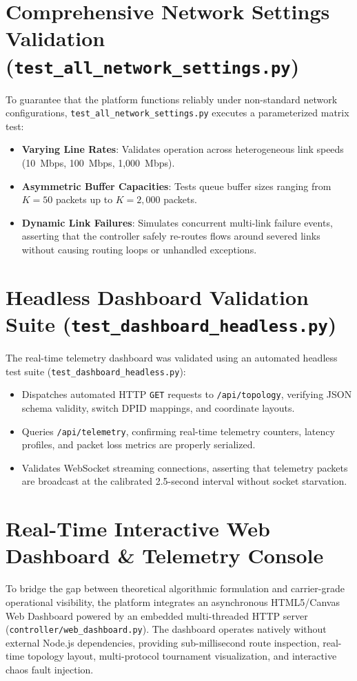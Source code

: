 \section{Comprehensive Network Settings Validation (\texttt{test\_all\_network\_settings.py})}
To guarantee that the platform functions reliably under non-standard network configurations, \texttt{test\_all\_network\_settings.py} executes a parameterized matrix test:
\begin{itemize}
    \item \textbf{Varying Line Rates}: Validates operation across heterogeneous link speeds (10~Mbps, 100~Mbps, 1,000~Mbps).
    \item \textbf{Asymmetric Buffer Capacities}: Tests queue buffer sizes ranging from $K = 50$ packets up to $K = 2,000$ packets.
    \item \textbf{Dynamic Link Failures}: Simulates concurrent multi-link failure events, asserting that the controller safely re-routes flows around severed links without causing routing loops or unhandled exceptions.
\end{itemize}

\section{Headless Dashboard Validation Suite (\texttt{test\_dashboard\_headless.py})}
The real-time telemetry dashboard was validated using an automated headless test suite (\texttt{test\_dashboard\_headless.py}):
\begin{itemize}
    \item Dispatches automated HTTP \texttt{GET} requests to \texttt{/api/topology}, verifying JSON schema validity, switch DPID mappings, and coordinate layouts.
    \item Queries \texttt{/api/telemetry}, confirming real-time telemetry counters, latency profiles, and packet loss metrics are properly serialized.
    \item Validates WebSocket streaming connections, asserting that telemetry packets are broadcast at the calibrated 2.5-second interval without socket starvation.
\end{itemize}

\section{Real-Time Interactive Web Dashboard \& Telemetry Console}
\label{sec:web_dashboard_operations}
To bridge the gap between theoretical algorithmic formulation and carrier-grade operational visibility, the platform integrates an asynchronous HTML5/Canvas Web Dashboard powered by an embedded multi-threaded HTTP server (\texttt{controller/web\_dashboard.py}). The dashboard operates natively without external Node.js dependencies, providing sub-millisecond route inspection, real-time topology layout, multi-protocol tournament visualization, and interactive chaos fault injection.

